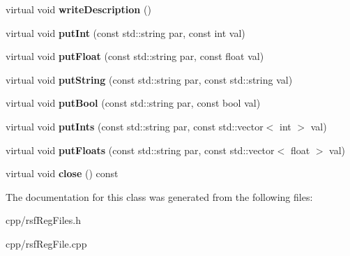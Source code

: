 \begin{DoxyCompactItemize}
virtual void {\bfseries write\+Description} ()
\item 
\mbox{\label{classrsf_reg_file_aba94596a4b7739909a551acaa4e0e44a}} 
virtual void {\bfseries put\+Int} (const std\+::string par, const int val)
\item 
\mbox{\label{classrsf_reg_file_a689ec91cc2448f2e2e63a49b0cf74c49}} 
virtual void {\bfseries put\+Float} (const std\+::string par, const float val)
\item 
\mbox{\label{classrsf_reg_file_a802a28f6613f972acc9ed296a6583497}} 
virtual void {\bfseries put\+String} (const std\+::string par, const std\+::string val)
\item 
\mbox{\label{classrsf_reg_file_a78c48ba313da3b172adcac914d9b664a}} 
virtual void {\bfseries put\+Bool} (const std\+::string par, const bool val)
\item 
\mbox{\label{classrsf_reg_file_a5aa69b69bf93dad50588a5f51bf6b5d1}} 
virtual void {\bfseries put\+Ints} (const std\+::string par, const std\+::vector$<$ int $>$ val)
\item 
\mbox{\label{classrsf_reg_file_a6e1983eb849ce3576bf7969d1e73af36}} 
virtual void {\bfseries put\+Floats} (const std\+::string par, const std\+::vector$<$ float $>$ val)
\item 
\mbox{\label{classrsf_reg_file_ae0b965f2ce69c1341c0e7b37d20d0614}} 
virtual void {\bfseries close} () const
\end{DoxyCompactItemize}


The documentation for this class was generated from the following files\+:\begin{DoxyCompactItemize}
\item 
cpp/rsf\+Reg\+Files.\+h\item 
cpp/rsf\+Reg\+File.\+cpp\end{DoxyCompactItemize}
